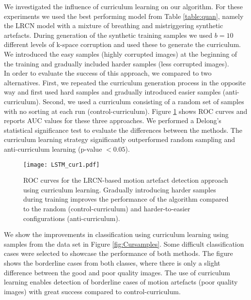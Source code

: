 \documentclass[preprint,12pt,authoryear]{elsarticle}
\begin{document}
We investigated the influence of curriculum learning on our algorithm. For these experiments we used the best performing model from Table \ref{table:quan}, namely the LRCN model with a mixture of breathing and mistriggering synthetic artefacts.  During generation of the synthetic training samples we used $b=10$ different levels of k-space corruption and used these to generate the curriculum. We introduced the easy samples (highly corrupted images) at the beginning of the training and gradually included harder samples (less corrupted images).\\

In order to evaluate the success of this approach, we compared to two alternatives. First, we repeated the curriculum generation process in the opposite way and first used hard samples and gradually introduced easier samples (anti-curriculum). Second, we used a curriculum consisting of a random set of samples with no sorting at each run (control-curriculum). Figure \ref{fig:Curresult} shows ROC curves and reports AUC values for these three approaches. We performed a Delong's statistical significance test \citep{Delong1988} to evaluate the differences between the methods. The curriculum learning strategy significantly outperformed random sampling and anti-curriculum learning (p-value $ < 0.05$).\\




 \begin{figure}[tb]
  \centering
  \centerline{\texttt{[image: LSTM\_cur1.pdf]}}
\caption{ROC curves for the LRCN-based motion artefact detection approach using curriculum learning. Gradually introducing harder samples during training improves the performance of the algorithm compared to the random (control-curriculum) and harder-to-easier configurations (anti-curriculum).}
\label{fig:Curresult}
\end{figure}

We show the improvements in classification using curriculum learning using samples from the data set in Figure \ref{fig:Cursamples}. Some difficult classification cases were selected to showcase the performance of both methods. The figure shows the borderline cases from both classes, where there is only a slight difference between the good and poor quality images. The use of curriculum learning enables detection of borderline cases of motion artefacts (poor quality images) with great success compared to control-curriculum.
\end{document}
